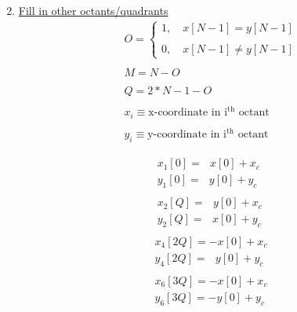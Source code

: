 \documentclass{article}
\begin{document}
\begin{enumerate}
\begin{align*}
          \end{align*}
    \item \underline{Fill in other octants/quadrants} \\
        \begin{align*}
            &O = \begin{cases}
                      1, \quad x[N - 1] = y[N - 1] \\ \\
                      0, \quad x[N - 1] \not= y[N -1] 
                    \end{cases} \\ \\
            &M = N - O \\ \\
            &Q = 2*N - 1 - O \\ \\
            &x_{i} \equiv \text{x-coordinate in }\text{i}^{\text{th}}\text{ octant} \\ \\
            &y_{i} \equiv \text{y-coordinate in }\text{i}^{\text{th}}\text{ octant}
          \end{align*}

        \begin{align*}
            &\ x_{1}[0] = \ \ \ x[0] + x_c \\
            &\ y_{1}[0] = \ \ \ y[0] + y_c \\ \\
            &\ x_{2}[Q] = \ \ \ y[0] + x_c \\
            &\ y_{2}[Q] = \ \ \ x[0] + y_c \\ \\
            &x_{4}[2Q] = -x[0] + x_c \\
            &y_{4}[2Q] = \ \ \ y[0] + y_c \\ \\
            &x_{6}[3Q] = -x[0] + x_c \\
            &y_{6}[3Q] = -y[0] + y_c \\ \\
          \end{align*}


\end{enumerate}
\end{document}
